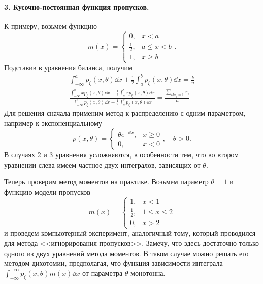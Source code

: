     \paragraph{3. Кусочно-постоянная функция пропусков.} К примеру, возьмем функцию
    \begin{equation*}
        m(x) = \begin{cases}
            0, & x < a \\
            \frac12, & a \le x < b \\
            1, & x \ge b
        \end{cases}.
    \end{equation*}
    Подставив в уравнения баланса, получим
    \begin{gather*}
        \int_{-\infty}^{a}p_\xi(x,\theta)\dd x + \frac12\int_{a}^{b}p_\xi(x,\theta)\dd x = \frac{k}{n} \\
        \frac{\int_{-\infty}^{a}xp_\xi(x,\theta)\dd x + \frac12\int_{a}^{b}xp_\xi(x,\theta)\dd x}%
            {\int_{-\infty}^{c}p_\xi(x,\theta)\dd x + \frac12\int_{a}^{b}p_\xi(x,\theta)\dd x} = \frac{\sum_{obs_i = 1}x_i}{n}
    \end{gather*}
    Для решения сначала применим метод к распределению с одним параметром, например к экспоненциальному
    \begin{equation*}
        p(x,\theta) = \begin{cases}
                \theta e^{-\theta x}, &  x \ge 0 \\
                0,                    &  x < 0 
            \end{cases}, \quad \theta > 0.
    \end{equation*}
    В случаях 2 и 3 уравнения усложняются, в особенности тем, что во втором уравнении слева имеем частное
    двух интегралов, зависящих от $\theta$. 

    Теперь проверим метод моментов на практике. Возьмем параметр $\theta = 1$ и функцию модели пропусков
    \begin{equation*}
        m(x) = \begin{cases}
                1,       & x < 1 \\
                \frac12, & 1 \le x \le 2 \\
                0,       & x > 2
            \end{cases}
    \end{equation*}
    и проведем компьютерный эксперимент, аналогичный тому, который проводился для метода <<игнорирования пропусков>>. 
    Замечу, что здесь достаточно только одного из двух уравнений метода моментов. В таком случае можно решать его методом дихотомии, предполагая, что функция зависимости интеграла $\int_{-\infty}^{+\infty}p_\xi(x,\theta)m(x)\dd x$ от параметра $\theta$ монотонна.

